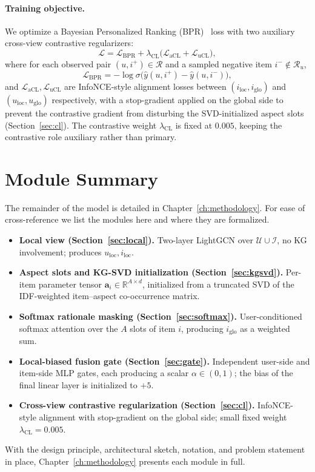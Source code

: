 \paragraph{Training objective.} We optimize a Bayesian Personalized Ranking (BPR)~\cite{rendle2009bpr} loss with two auxiliary cross-view contrastive regularizers:
\begin{equation}
\label{eq:total-loss}
\mathcal{L} = \mathcal{L}_{\mathrm{BPR}} + \lambda_{\mathrm{CL}} \bigl( \mathcal{L}_{\mathrm{aCL}} + \mathcal{L}_{\mathrm{uCL}} \bigr),
\end{equation}
where for each observed pair $(u, i^+) \in \mathcal{R}$ and a sampled negative item $i^- \notin \mathcal{R}_u$,
\begin{equation}
\label{eq:bpr}
\mathcal{L}_{\mathrm{BPR}} = - \log \sigma\bigl( \hat{y}(u, i^+) - \hat{y}(u, i^-) \bigr),
\end{equation}
and $\mathcal{L}_{\mathrm{aCL}}, \mathcal{L}_{\mathrm{uCL}}$ are InfoNCE-style alignment losses between $(i_{\mathrm{loc}}, i_{\mathrm{glo}})$ and $(u_{\mathrm{loc}}, u_{\mathrm{glo}})$ respectively, with a stop-gradient applied on the global side to prevent the contrastive gradient from disturbing the SVD-initialized aspect slots (Section~\ref{sec:cl}). The contrastive weight $\lambda_{\mathrm{CL}}$ is fixed at $0.005$, keeping the contrastive role auxiliary rather than primary.

\section{Module Summary}
\label{sec:approach-modules}

The remainder of the model is detailed in Chapter~\ref{ch:methodology}. For ease of cross-reference we list the modules here and where they are formalized.

\begin{itemize}
  \item \textbf{Local view (Section~\ref{sec:local}).} Two-layer LightGCN over $\mathcal{U} \cup \mathcal{I}$, no KG involvement; produces $u_{\mathrm{loc}}, i_{\mathrm{loc}}$.
  \item \textbf{Aspect slots and KG-SVD initialization (Section~\ref{sec:kgsvd}).} Per-item parameter tensor $\mathbf{a}_i \in \mathbb{R}^{A \times d}$, initialized from a truncated SVD of the IDF-weighted item--aspect co-occurrence matrix.
  \item \textbf{Softmax rationale masking (Section~\ref{sec:softmax}).} User-conditioned softmax attention over the $A$ slots of item $i$, producing $i_{\mathrm{glo}}$ as a weighted sum.
  \item \textbf{Local-biased fusion gate (Section~\ref{sec:gate}).} Independent user-side and item-side MLP gates, each producing a scalar $\alpha \in (0, 1)$; the bias of the final linear layer is initialized to $+5$.
  \item \textbf{Cross-view contrastive regularization (Section~\ref{sec:cl}).} InfoNCE-style alignment with stop-gradient on the global side; small fixed weight $\lambda_{\mathrm{CL}} = 0.005$.
\end{itemize}

With the design principle, architectural sketch, notation, and problem statement in place, Chapter~\ref{ch:methodology} presents each module in full.
